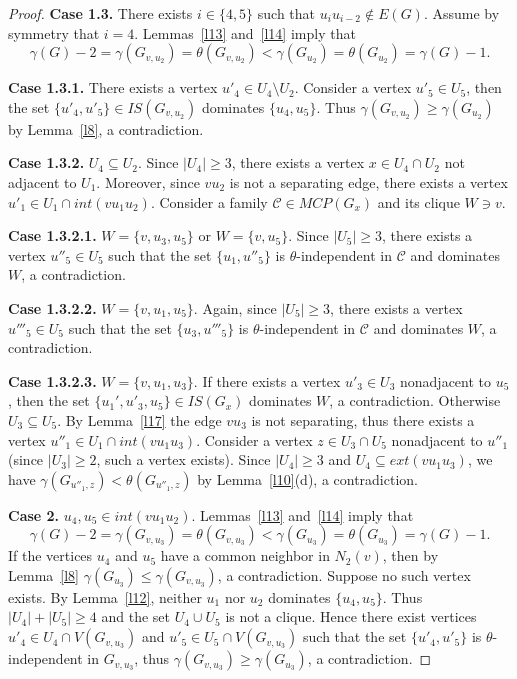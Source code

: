 \documentclass[12pt]{article}
\begin{document}
\begin{proof}
\textbf{Case 1.3.} There exists $i \in \{4,5\}$ such that $u_iu_{i-2} \notin E(G)$. Assume by symmetry that $i = 4$. Lemmas~\ref{l13} and~\ref{l14} imply that 
$$\gamma(G) - 2 = \gamma(G_{v,u_2}) = \theta(G_{v,u_2}) < \gamma(G_{u_2}) = \theta(G_{u_2}) = \gamma(G) - 1.$$ 

\textbf{Case 1.3.1.} There exists a vertex $u'_4 \in U_4 \setminus U_2$. Consider a vertex $u'_5 \in U_5$, then the set $\{u'_4,u'_5\} \in IS(G_{v,u_2})$  dominates $\{u_4,u_5\}$. Thus $\gamma(G_{v,u_2}) \geq \gamma(G_{u_2})$ by Lemma~\ref{l8}, a contradiction. 

\textbf{Case 1.3.2.} $U_4 \subseteq U_2$. Since $|U_4| \geq 3$, there exists a vertex $x \in U_4 \cap U_2$ not adjacent to $U_1$. Moreover, since $vu_2$ is not a separating edge, there exists a vertex $u'_1 \in U_1 \cap int(vu_1u_2)$. Consider a family $\mathcal{C} \in MCP(G_x)$ and its clique $W \ni v$. 

\textbf{Case 1.3.2.1.} $W = \{v,u_3,u_5\}$ or $W = \{v,u_5\}$. Since $|U_5| \geq 3$, there exists a vertex $u''_5 \in U_5$ such that the set $\{u_1,u''_5\}$ is $\theta$-independent in $\mathcal{C}$ and dominates $W$, a contradiction.

\textbf{Case 1.3.2.2. }$W = \{v,u_1,u_5\}$. Again, since $|U_5| \geq 3$, there exists a vertex $u'''_5 \in U_5$ such that the set $\{u_3,u'''_5\}$ is $\theta$-independent in $\mathcal{C}$ and dominates $W$, a contradiction. 

\textbf{Case 1.3.2.3.} $W = \{v,u_1,u_3\}$. If there exists a vertex $u'_3 \in U_3$ nonadjacent to $u_5$, then the set $\{u_1',u'_3,u_5\} \in IS(G_{x})$ dominates $W$, a contradiction. Otherwise $U_3 \subseteq U_5$. By Lemma~\ref{l17} the edge $vu_3$ is not separating, thus there exists a vertex $u''_1 \in U_1 \cap int(vu_1u_3)$. Consider a vertex $z \in U_3 \cap U_5$ nonadjacent to $u''_1$ (since $|U_3| \geq 2$, such a vertex exists). Since $|U_4| \geq 3$ and $U_4 \subseteq ext(vu_1u_3)$, we have $\gamma(G_{u''_1,z}) < \theta(G_{u''_1,z})$ by Lemma~\ref{l10}(d), a contradiction.

\textbf{Case 2.} $u_4,u_5 \in int(vu_1u_2)$. Lemmas~\ref{l13} and~\ref{l14} imply that  $$\gamma(G) - 2 = \gamma(G_{v,u_3}) = \theta(G_{v,u_3}) < \gamma(G_{u_3}) = \theta(G_{u_3}) = \gamma(G) - 1.$$ If the vertices $u_4$ and $u_5$ have a common neighbor in $N_2(v)$, then by Lemma~\ref{l8} $\gamma(G_{u_3}) \leq \gamma(G_{v,u_3})$, a contradiction. Suppose no such vertex exists. By Lemma~\ref{l12}, neither $u_1$ nor $u_2$ dominates $\{u_4,u_5\}$. Thus $|U_4| + |U_5| \geq 4$ and the set $U_4 \cup U_5$ is not a clique. Hence there exist vertices $u'_4 \in U_4 \cap V(G_{v,u_3})$ and $u'_5 \in U_5 \cap V(G_{v,u_3})$ such that the set $\{u'_4,u'_5\}$ is $\theta$-independent in $G_{v,u_3}$, thus $\gamma(G_{v,u_3}) \geq \gamma(G_{u_3})$, a contradiction.
\end{proof}
\end{document}
